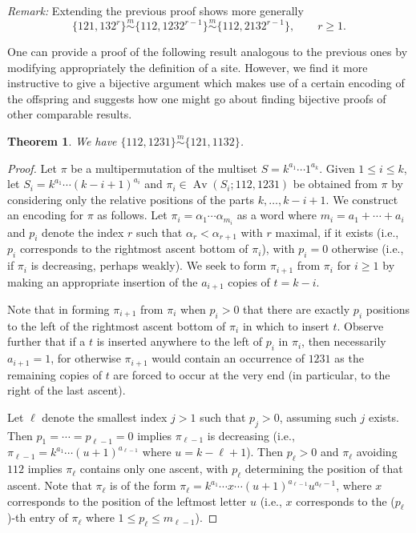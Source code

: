 \documentclass[11pt]{amsart}
\theoremstyle{plain}
\newtheorem{theorem}{Theorem}[section]
\theoremstyle{definition}
\newcommand{\csim}{\stackrel{m}{\sim}}
\DeclareMathOperator{\Av}{Av}
\begin{document}
\emph{Remark:} Extending the previous proof shows more generally
$$\{121,132^r\}\csim\{112,1232^{r-1}\}\csim\{112,2132^{r-1}\}, \qquad r \geq 1.$$

One can provide a proof of the following result analogous to the previous ones by modifying appropriately the definition of a site.  However, we find it more instructive to give a bijective argument which makes use of a certain encoding of the offspring and suggests how one might go about finding bijective proofs of other comparable results.

\begin{theorem}\label{teormulti1}
We have $\{112,1231\}\csim\{121,1132\}$.
\end{theorem}
\begin{proof}
Let  $\pi$ be a multipermutation of
the multiset $S=k^{a_1}\cdots 1^{a_k}$.  Given $1 \leq i \leq k$, let $S_i=k^{a_1}\cdots
(k-i+1)^{a_i}$ and $\pi_i \in \Av(S_i;112,1231)$ be obtained from $\pi$ by considering only the relative
positions of the parts $k,\ldots,k-i+1$.  We construct an encoding for $\pi$ as follows. Let
$\pi_i=\alpha_1\cdots\alpha_{m_i}$ as a word where $m_i=a_1+\cdots+a_i$ and $p_i$ denote the index
$r$ such that $\alpha_r<\alpha_{r+1}$ with $r$ maximal, if it exists (i.e., $p_i$ corresponds to the
rightmost ascent bottom of $\pi_i$), with $p_i=0$ otherwise (i.e., if $\pi_i$ is decreasing, perhaps
weakly). We seek to form $\pi_{i+1}$ from $\pi_{i}$ for $i\geq1$ by making an appropriate insertion of
the $a_{i+1}$ copies of $t=k-i$.

Note that in forming $\pi_{i+1}$ from $\pi_{i}$ when $p_{i}>0$ that there are exactly $p_{i}$
positions to the left of the rightmost ascent bottom of $\pi_{i}$ in which to insert $t$.
Observe further that if a $t$ is inserted anywhere to the left of $p_{i}$ in $\pi_{i}$, then
necessarily $a_{i+1}=1$, for otherwise $\pi_{i+1}$ would contain an occurrence of $1231$ as the remaining
copies of $t$ are forced to occur at the very end (in particular, to the right of the last ascent).

Let $\ell$ denote the smallest index $j>1$ such that $p_j>0$, assuming such $j$ exists.  Then
$p_1=\cdots=p_{\ell-1}=0$ implies $\pi_{\ell-1}$ is decreasing (i.e., $\pi_{\ell-1}=k^{a_1}\cdots
(u+1)^{a_{\ell-1}}$ where $u=k-\ell+1$).  Then $p_\ell>0$ and $\pi_\ell$ avoiding $112$ implies $\pi_\ell$ contains only one ascent, with $p_\ell$ determining the position of that ascent.
Note that $\pi_\ell$ is of the form $\pi_\ell=k^{a_1}\cdots x\cdots
(u+1)^{a_{\ell-1}}u^{a_\ell-1}$, where $x$ corresponds to the position of the leftmost
letter $u$ (i.e., $x$ corresponds to the ($p_\ell$)-th entry of $\pi_\ell$ where $1 \leq p_\ell
\leq m_{\ell-1}$).


\end{proof}
\end{document}

